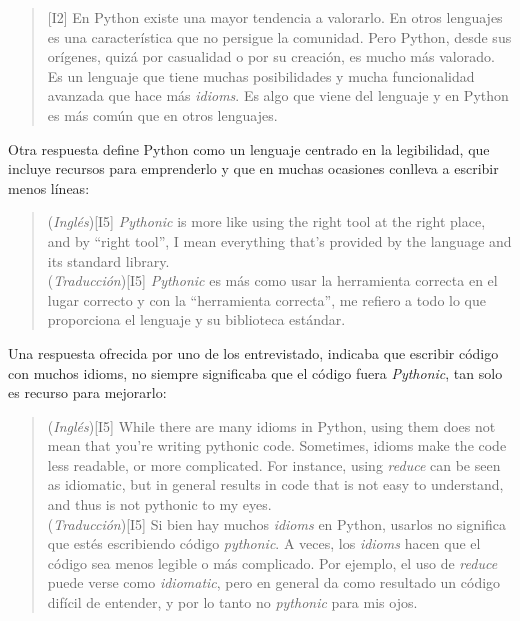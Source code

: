 \documentclass[a4paper, 12pt]{book}
\begin{document}
\begin{quote}
\small
    [I2] En Python existe una mayor tendencia a valorarlo. En otros lenguajes es una característica que no persigue la comunidad. Pero Python, desde sus orígenes, quizá por casualidad o por su creación, es mucho más valorado. Es un lenguaje que tiene muchas posibilidades y mucha funcionalidad avanzada que hace más \textit{idioms}. Es algo que viene del lenguaje y en Python es más común que en otros lenguajes.

\end{quote}

Otra respuesta define Python como un lenguaje centrado en la legibilidad, que incluye recursos para emprenderlo y que en muchas ocasiones conlleva a escribir menos líneas:

\begin{quote}
\small
    (\textit{Inglés})[I5] \textit{Pythonic} is more like using the right tool at the right place, and by ``right tool'', I mean everything that's provided by the language and its standard library.\\
    (\textit{Traducción})[I5] \textit{Pythonic} es más como usar la herramienta correcta en el lugar correcto y con la ``herramienta correcta'', me refiero a todo lo que proporciona el lenguaje y su biblioteca estándar.

\end{quote}

Una respuesta ofrecida por uno de los entrevistado, indicaba que escribir código con muchos idioms, no siempre significaba que el código fuera \textit{Pythonic}, tan solo es recurso para mejorarlo:

\begin{quote}
\small
        (\textit{Inglés})[I5] While there are many idioms in Python, using them does not mean that you're writing pythonic code. Sometimes, idioms make the code less readable, or more complicated. For instance, using \emph{reduce} can be seen as idiomatic, but in general results in code that is not easy to understand, and thus is not pythonic to my eyes.\\
        (\textit{Traducción})[I5] Si bien hay muchos \textit{idioms} en Python, usarlos no significa que estés escribiendo código \textit{pythonic}. A veces, los \textit{idioms} hacen que el código sea menos legible o más complicado. Por ejemplo, el uso de \textit{reduce} puede verse como \textit{idiomatic}, pero en general da como resultado un código difícil de entender, y por lo tanto no \textit{pythonic} para mis ojos.
\end{quote}
\end{document}

